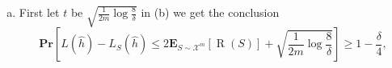 \documentclass{article}
\theoremstyle{definition}
\begin{document}
\begin{enumerate}[(a)]
	 	\begin{equation}
	 		\mathbf{Pr}[|Z_m-Z_0|\geq t] \leq 2e^{-2mt^2}
	 	\end{equation}
 		let $t$ be $\sqrt{\frac{1}{2m}\log\frac{2}{\delta}}$, 
 	 	\begin{equation}
		 	\mathbf{Pr}[|Z_m-Z_0|\geq \sqrt{\frac{1}{2m}\log\frac{2}{\delta}}] \leq \delta, 
		 \end{equation}
	 	or, since $Z_i$ is defined with sup, 
		 \begin{equation}
		 	\forall h \in \mathcal H, \mathbf{Pr}[L(h)-L_S(h)-\mathbf E_{S\sim \mathcal X^m}[\operatorname{Rep}(S)]\leq \sqrt{\frac{1}{2m}\log\frac{2}{\delta}}] \geq 1-\delta, 
		 \end{equation}
	 	and given $\mathbf E_{S\sim \mathcal X^m}(S)\leq 2\mathbf E_{S\sim \mathcal X^m}[\operatorname{R}(S)]$, finally
	 	\begin{equation}
	 		\forall h \in \mathcal H, \mathbf{Pr}[L(h)-L_S(h)\leq 2\mathbf E_{S\sim \mathcal X^m}[\operatorname{R}(S)]+\sqrt{\frac{1}{2m}\log\frac{2}{\delta}}] \geq 1-\delta, 
	 	\end{equation}
 		\item First let $t$ be $\sqrt{\frac{1}{2m}\log\frac{8}{\delta}}$ in (b) we get the conclusion
 		\begin{equation}
 			\mathbf{Pr}[L(\widehat h)-L_S(\widehat h)\leq 2\mathbf E_{S\sim \mathcal X^m}[\operatorname{R}(S)]+\sqrt{\frac{1}{2m}\log\frac{8}{\delta}}] \geq 1-\frac\delta 4, 
 		\end{equation}
 	

\end{enumerate}
\end{document}

